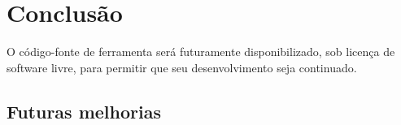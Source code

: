 \chapter{Conclusão}

O código-fonte de ferramenta será futuramente disponibilizado, sob licença de software livre, para permitir que seu desenvolvimento seja continuado.

\section{Futuras melhorias}


